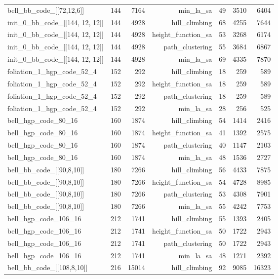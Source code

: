 \begin{longtable}{lrrrrrr}
  bell\_bb\_code\_[[72,12,6]] & 144 & 7164 & min\_la\_sa & 49 & 3510 & 6404 \\
  init\_0\_bb\_code\_[[144, 12, 12]] & 144 & 4928 & hill\_climbing & 68 & 4255 & 7644 \\
  init\_0\_bb\_code\_[[144, 12, 12]] & 144 & 4928 & height\_function\_sa & 53 & 3268 & 6174 \\
  init\_0\_bb\_code\_[[144, 12, 12]] & 144 & 4928 & path\_clustering & 55 & 3684 & 6867 \\
  init\_0\_bb\_code\_[[144, 12, 12]] & 144 & 4928 & min\_la\_sa & 69 & 4335 & 7870 \\
  foliation\_1\_hgp\_code\_52\_4 & 152 & 292 & hill\_climbing & 18 & 259 & 589 \\
  foliation\_1\_hgp\_code\_52\_4 & 152 & 292 & height\_function\_sa & 18 & 259 & 589 \\
  foliation\_1\_hgp\_code\_52\_4 & 152 & 292 & path\_clustering & 18 & 259 & 589 \\
  foliation\_1\_hgp\_code\_52\_4 & 152 & 292 & min\_la\_sa & 28 & 256 & 525 \\
  bell\_hgp\_code\_80\_16 & 160 & 1874 & hill\_climbing & 54 & 1414 & 2416 \\
  bell\_hgp\_code\_80\_16 & 160 & 1874 & height\_function\_sa & 41 & 1392 & 2575 \\
  bell\_hgp\_code\_80\_16 & 160 & 1874 & path\_clustering & 40 & 1147 & 2103 \\
  bell\_hgp\_code\_80\_16 & 160 & 1874 & min\_la\_sa & 48 & 1536 & 2727 \\
  bell\_bb\_code\_[[90,8,10]] & 180 & 7266 & hill\_climbing & 56 & 4433 & 7875 \\
  bell\_bb\_code\_[[90,8,10]] & 180 & 7266 & height\_function\_sa & 54 & 4728 & 8985 \\
  bell\_bb\_code\_[[90,8,10]] & 180 & 7266 & path\_clustering & 53 & 4308 & 7901 \\
  bell\_bb\_code\_[[90,8,10]] & 180 & 7266 & min\_la\_sa & 55 & 4242 & 7753 \\
  bell\_hgp\_code\_106\_16 & 212 & 1741 & hill\_climbing & 55 & 1393 & 2405 \\
  bell\_hgp\_code\_106\_16 & 212 & 1741 & height\_function\_sa & 50 & 1722 & 2943 \\
  bell\_hgp\_code\_106\_16 & 212 & 1741 & path\_clustering & 50 & 1722 & 2943 \\
  bell\_hgp\_code\_106\_16 & 212 & 1741 & min\_la\_sa & 48 & 1271 & 2392 \\
  bell\_bb\_code\_[[108,8,10]] & 216 & 15014 & hill\_climbing & 92 & 9085 & 16323 \\

\end{longtable}
